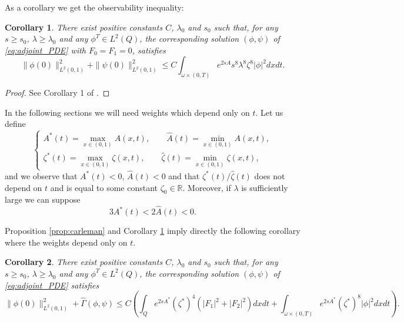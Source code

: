 \documentclass[11pt,oneside,a4papper]{osajnl}
\newtheorem{coro}{Corollary}
\newcommand{\R}{\mathbb{R}}
\begin{document}
As a corollary we get the observability inequality:
\begin{coro} %
\label{cor:observability}
There exist positive constants $C$, $\lambda_0$ and $s_0$ such that, for any $s \geq s_0$, $\lambda \geq \lambda_0$ and any $\phi^T\in L^2(Q)$, the corresponding solution $(\phi,\psi)$ of \eqref{eq:adjoint_PDE} with $F_0 = F_1 = 0$, satisfies
\begin{equation}\label{Observability}
\|\phi(0)\|^2_{L^2(0,1)} + \|\psi(0)\|^2_{L^2(0,1)} \leq C \int_{\omega \times (0,T)} e^{2s A} s^8 \lambda^8 \zeta^8 |\phi|^2dxdt.
\end{equation}
\end{coro}
\begin{proof}
    See Corollary 1 of \cite{DemarqueLimacoViana_deg_sys2020}. 
\end{proof}
\color{black}

In the following sections we will need weights which depend only on $t$. Let us define
\begin{equation*}
\begin{cases}
A^*(t) = \displaystyle\max_{x \in (0,1)} A(x,t), \qquad \hat A(t) = \displaystyle\min_{x \in (0,1)} A(x,t), \\
\zeta^*(t) = \displaystyle\max_{x \in (0,1)} \zeta(x,t), \qquad \hat \zeta(t) = \displaystyle\min_{x \in (0,1)} \zeta(x,t),
\end{cases}
\end{equation*}
and we observe that $A^*(t) < 0$, $\hat A(t) < 0$ and that $\zeta^*(t) / \hat \zeta(t)$ does not depend on $t$ and is equal to some constant $\zeta_0 \in \R$. Moreover, if $\lambda$ is sufficiently large we can suppose
\begin{equation}
\label{eq:comp_pesos}
3 A^*(t) < 2 \hat A(t) < 0.
\end{equation}

Proposition \ref{prop:carleman} and Corollary \ref{cor:observability}  imply directly the following corollary where the weights depend only on $t$.

\begin{coro} %
\label{cor:carleman_pesos_t}
There exist positive constants $C$, $\lambda_0$ and $s_0$ such that, for any $s \geq s_0$, $\lambda \geq \lambda_0$ and any $\phi^T \in L^2(Q)$, the corresponding solution $(\phi,\psi)$ of \eqref{eq:adjoint_PDE} satisfies
\begin{equation}
\label{pesos_t_Carleman for eq:adjoint_optimality_system}
\|\phi(0)\|^2_{L^2(0,1)} + \hat \Gamma(\phi,\psi) \leq C \left( \int_Q e^{2s A^*} (\zeta^*)^4 (|F_1|^2+|F_2|^2)dxdt + \int_{\omega \times (0,T)} e^{2s A^*} (\zeta^*)^8 |\phi|^2 dxdt \right).
\end{equation}
\end{coro}
\end{document}
